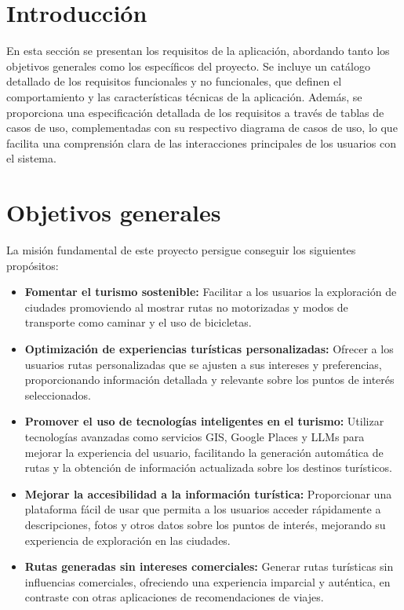 
\section{Introducción}
En esta sección se presentan los requisitos de la aplicación, abordando tanto los objetivos generales como los específicos del proyecto. Se incluye un catálogo detallado de los requisitos funcionales y no funcionales, que definen el comportamiento y las características técnicas de la aplicación. Además, se proporciona una especificación detallada de los requisitos a través de tablas de casos de uso, complementadas con su respectivo diagrama de casos de uso, lo que facilita una comprensión clara de las interacciones principales de los usuarios con el sistema.


\section{Objetivos generales}
La misión fundamental de este proyecto persigue conseguir los siguientes propósitos:
\begin{itemize}
	\item \textbf{Fomentar el turismo sostenible:} Facilitar a los usuarios la exploración de ciudades promoviendo al mostrar rutas no motorizadas y modos de transporte como caminar y el uso de bicicletas.
	
	\item \textbf{Optimización de experiencias turísticas personalizadas:} Ofrecer a los usuarios rutas personalizadas que se ajusten a sus intereses y preferencias, proporcionando información detallada y relevante sobre los puntos de interés seleccionados.
	
	\item \textbf{Promover el uso de tecnologías inteligentes en el turismo:} Utilizar tecnologías avanzadas como servicios GIS, Google Places y LLMs para mejorar la experiencia del usuario, facilitando la generación automática de rutas y la obtención de información actualizada sobre los destinos turísticos.
	
	\item \textbf{Mejorar la accesibilidad a la información turística:} Proporcionar una plataforma fácil de usar que permita a los usuarios acceder rápidamente a descripciones, fotos y otros datos sobre los puntos de interés, mejorando su experiencia de exploración en las ciudades.
	
	\item \textbf{Rutas generadas sin intereses comerciales:} Generar rutas turísticas sin influencias comerciales, ofreciendo una experiencia imparcial y auténtica, en contraste con otras aplicaciones de recomendaciones de viajes.
\end{itemize}

